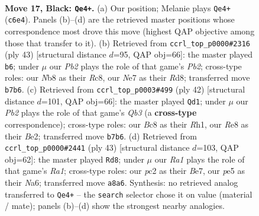 \documentclass[11pt]{article}
\begin{document}
\clearpage

\begin{figure}[p]\centering
\begin{subfigure}{0.46\textwidth}\centering
\resizebox{\linewidth}{!}{%
\newchessgame
\chessboard[
  setfen={rnb1r3/1p2npkp/2q1p3/p1P1P1PQ/2B2P2/P7/2P5/R1B1K1NR b KQ - 2 17},
  showmover=false,
  pgfstyle=straightmove, color=movearrow, markmove={c6-e4}
]}
\caption{}
\end{subfigure}\hfill
\begin{subfigure}{0.46\textwidth}\centering
\resizebox{\linewidth}{!}{%
\newchessgame
\chessboard[
  setfen={2rrb3/pp3pk1/2nq2p1/3p2Pp/3P3P/P1P2Q2/3N1PB1/R3R1K1 b - - 2 22},
  showmover=false,
  pgfstyle=straightmove, color=movearrow, markmove={b7-b6}
]}
\caption{}
\end{subfigure}
\\[4pt]
\begin{subfigure}{0.46\textwidth}\centering
\resizebox{\linewidth}{!}{%
\newchessgame
\chessboard[
  setfen={1r1q1r1k/3b3p/3p2pb/pP2pp2/R3P2P/1QN5/1P2BPP1/4K2R w K - 0 22},
  showmover=false,
  pgfstyle=straightmove, color=movearrow, markmove={b3-d1}
]}
\caption{}
\end{subfigure}\hfill
\begin{subfigure}{0.46\textwidth}\centering
\resizebox{\linewidth}{!}{%
\newchessgame
\chessboard[
  setfen={r6k/1pq1b1p1/n4r1p/p2p3Q/P2Np3/2P1B2P/1P3PP1/R3R1K1 b - - 3 22},
  showmover=false,
  pgfstyle=straightmove, color=movearrow, markmove={a8-d8}
]}
\caption{}
\end{subfigure}
\caption{\textbf{Move 17, Black: \texttt{Qe4+}.} (a) Our position; Melanie plays \texttt{Qe4+} (\texttt{c6e4}). Panels (b)--(d) are the retrieved master positions whose correspondence most drove this move (highest QAP objective among those that transfer to it). (b) Retrieved from \texttt{ccrl\_top\_p0000\#2316} (ply 43) [structural distance $d$=95, QAP obj=66]: the master played \texttt{b6}; under $\mu$ our \emph{Pb2} plays the role of that game's \emph{Pb2}; cross-type roles: our \emph{N}b8 as their \emph{R}c8, our \emph{N}e7 as their \emph{R}d8; transferred move \texttt{b7b6}. (c) Retrieved from \texttt{ccrl\_top\_p0003\#499} (ply 42) [structural distance $d$=101, QAP obj=66]: the master played \texttt{Qd1}; under $\mu$ our \emph{Pb2} plays the role of that game's \emph{Qb3} (a \textbf{cross-type} correspondence); cross-type roles: our \emph{B}c8 as their \emph{R}h1, our \emph{R}e8 as their \emph{B}e2; transferred move \texttt{b7b6}. (d) Retrieved from \texttt{ccrl\_top\_p0000\#2441} (ply 43) [structural distance $d$=103, QAP obj=62]: the master played \texttt{Rd8}; under $\mu$ our \emph{Ra1} plays the role of that game's \emph{Ra1}; cross-type roles: our \emph{p}c2 as their \emph{B}e7, our \emph{p}e5 as their \emph{N}a6; transferred move \texttt{a8a6}. Synthesis: no retrieved analog transferred to \texttt{Qe4+} -- the \texttt{search} selector chose it on value (material / mate); panels (b)--(d) show the strongest nearby analogies.}
\label{fig:thought-m33}
\end{figure}
\end{document}
